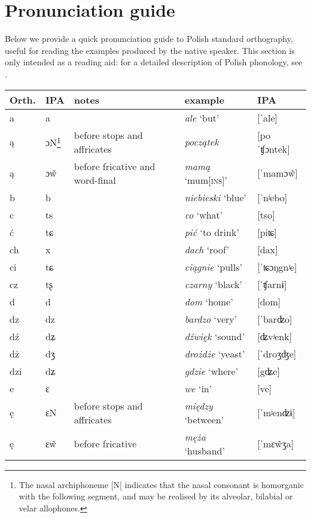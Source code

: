 \chapter{Pronunciation guide}\label{sec:9}
Below we provide a quick pronunciation guide to Polish standard orthography, useful for reading the examples produced by the native speaker. This section is only intended as a reading aid: for a detailed description of Polish phonology, see \citet{Gussman2007}.

{\centering
\footnotesize
    \begin{tabular}{lllll}
        \lsptoprule
        Orth. & IPA & notes & example & IPA\\
        \midrule
        a & a &  & \textit{ale} `but' & [ˈale]\\
        ą & ɔN\footnote{The nasal archiphoneme [N[ indicates that the nasal consonant is homorganic with the following segment, and may be realised by its alveolar, bilabial or velar allophones.} & before stops  and affricates & \textit{początek} & [poˈʧɔntek]\\
        ą & ɔ\~{w} & before fricative and word-final & \textit{mamą} `mum\textsc{[ins]}' & [ˈmamɔ\~{w}]\\
        b & b &  & \textit{niebieski} `blue' & [ˈnʲebo]\\
        c & ts &  & \textit{co} `what' & [tso]\\
        ć & tɕ &  & \textit{pić} `to drink' & [piʨ]\\
        ch & x &  & \textit{dach} `roof' & [dax]\\
        ci & tɕ &  & \textit{ciągnie} `pulls' & [ˈʨɔŋgnʲe]\\
        cz & tʂ &  & \textit{czarny} `black' & [ˈʧarnɨ]\\
        d & d &  & \textit{dom} `home' & [dom]\\
        dz & dz &  & \textit{bardzo} `very' & [ˈbarʣo]\\
        dź & dʑ &  & \textit{dźwięk} `sound' & [ʥvʲenk]\\
        dż & dʒ &  & \textit{drożdże} `yeast' & [ˈdroʒʤe]\\
        dzi & dʑ &  & \textit{gdzie} `where' & [gʥe]\\
        e & ɛ &  & \textit{we} `in' & [ve]\\
        ę & ɛN & before stops and affricates & \textit{między} `between' & [ˈmʲenʣɨ]\\
        ę & ɛ\~{w} & before fricative & \textit{męża} `husband' & [ˈmɛ\~{w}ʒa]\\

\end{tabular}}
